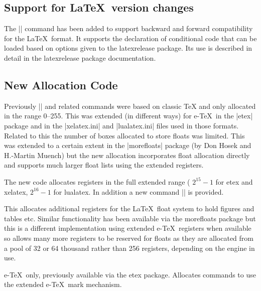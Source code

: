 \documentclass{ltxguide}
\newcommand\Lpack[1]{\mbox{\textsf{#1}}}
\newcommand\DescribeMacro[1]{\texttt{\string#1}}
\begin{document}
\subsection{Support for \LaTeX\ version changes}
\DescribeMacro{}

\smallskip

The || command has been added to support backward and
forward compatibility for the \LaTeX\ format. It supports the
declaration of conditional code that can be loaded based on options
given to the \Lpack{latexrelease} package. Its use is described in
detail in the \Lpack{latexrelease} package documentation.

\subsection{New Allocation Code\label{e@alloc}}
Previously |\newcount| and related commands were based on classic TeX
and only allocated in the range 0--255. This was extended (in
different ways) for e-\TeX\ in the |etex| package and in the
|xelatex.ini| and |lualatex.ini| files used in those formats. Related
to this the number of boxes allocated to store floats was
limited. This was extended to a certain extent in the |morefloats|
package (by Don Hosek and H.-Martin Muench) but the new allocation
incorporates float allocation directly and supports much larger float
lists using the extended registers.

The new code allocates registers in the full extended range (
$2^{15}-1$ for etex and xelatex, $2^{16}-1$ for lualatex.
In addition a new command |\extrafloats| is provided.

\DescribeMacro{\extrafloats}
\smallskip

This allocates additional registers for the \LaTeX\ float system to
hold figures and tables etc. Similar functionality has been
available via the \Lpack{morefloats} package but this is a different
implementation using extended e-\TeX\ registers when available so
allows many more registers to be reserved for floats as they are
allocated from a pool of 32 or 64 thousand rather than 256 registers,
depending on the engine in use.

\DescribeMacro{\newmarks}
\smallskip

e-\TeX\ only, previously available via the \Lpack{etex} package.
Allocates commands to use the extended  e-\TeX\ mark mechanism.
\end{document}
